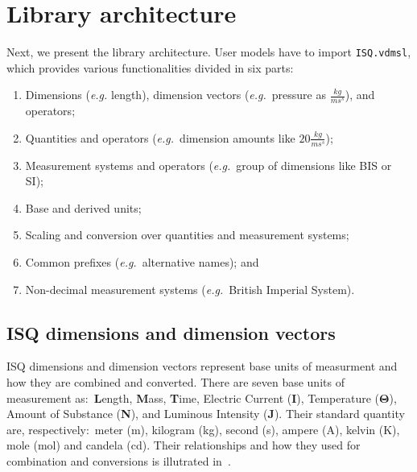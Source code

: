 \documentclass[runningheads,a4paper]{llncs}
\begin{document}
\section{Library architecture}\label{sec:architecture}

Next, we present the library architecture. User models have to import \texttt{ISQ.vdmsl}, which provides various functionalities divided in six parts: 
%
\begin{enumerate}
    \item Dimensions (\textit{e.g.} length), dimension vectors (\textit{e.g.}~pressure as \(\frac{kg}{ms^s}\)), and operators;
    \item Quantities and operators (\textit{e.g.}~dimension amounts like \(20\frac{kg}{ms^s}\));
    \item Measurement systems and operators (\textit{e.g.}~group of dimensions like BIS or SI); 
    \item Base and derived units;
    \item Scaling and conversion over quantities and measurement systems;
    \item Common prefixes (\textit{e.g.}~alternative names); and 
    \item Non-decimal measurement systems (\textit{e.g.}~British Imperial System). 
\end{enumerate} 

 
\subsection*{ISQ dimensions and dimension vectors}

ISQ dimensions and dimension vectors represent base units of measurment and how they are combined and converted. There are seven base units of measurement as:~\textbf{L}ength, \textbf{M}ass, \textbf{T}ime, Electric Current (\textbf{I}), Temperature (\(\mathbf{\Theta}\)), Amount of Substance (\textbf{N}), and Luminous Intensity (\textbf{J}). Their standard quantity are, respectively:~meter (m), kilogram (kg), second (s), ampere (A), kelvin (K), mole (mol) and candela (cd). Their relationships and how they used for combination and conversions is illutrated in~.  
\end{document}
